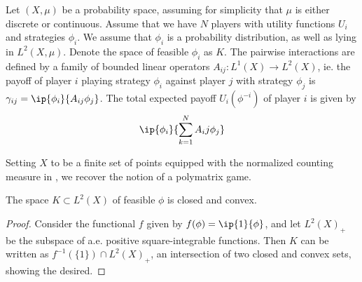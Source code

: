 



\begin{definition} \label{def:lin_game}
  Let $(X,\mu)$ be a probability space, assuming for simplicity that $\mu$ is either discrete or  continuous. Assume that we have $N$ players with utility functions $U_i$ and strategies $\phi_i$. We assume that $\phi_i$ is a probability distribution, as well as lying in $L^2(X,\mu)$. Denote the space of feasible $\phi_i$ as $K$. The pairwise interactions are defined by a family of bounded linear operators $A_{ij}: L^1(X)\to L^2(X)$, ie. the payoff of player $i$ playing strategy $\phi_i$ against player $j$ with strategy $\phi_j$ is $\gamma_{ij}=\ip{\phi_i}{A_{ij} \phi_j}$. The total expected payoff $U_i(\phi^{-i})$ of player $i$ is given by
  \begin{equation}
    \ip{\phi_i}{\sum_{k=1}^N A_ij \phi_j}
  \end{equation}
\end{definition}
\begin{remark}
  Setting $X$ to be a finite set of points equipped with the normalized counting measure in , we recover the notion of a polymatrix game.
\end{remark}
\begin{lemma}
  The space $K\subset L^2(X)$ of feasible $\phi$ is closed and convex.
\end{lemma}
\begin{proof}
  Consider the functional $f$ given by $f(\phi)=\ip{1}{\phi}$, and let $L^2(X)_+$ be the subspace of a.e. positive square-integrable functions. Then $K$ can be written as $f^{-1}(\{1\}) \cap L^2(X)_+$, an intersection of two closed and convex sets, showing the desired.
\end{proof}

